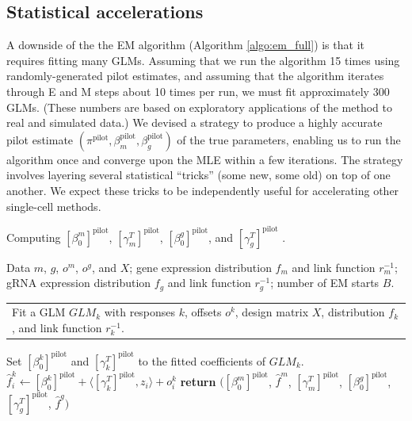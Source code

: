 \documentclass[11pt]{article}
\makeatletter
\newcommand{\multiline}[1]{%
	\begin{tabularx}{\dimexpr\linewidth-\ALG@thistlm}[t]{@{}X@{}}
		#1
	\end{tabularx}
}
\makeatother
\begin{document}
\subsection{Statistical accelerations}
A downside of the the EM algorithm (Algorithm \ref{algo:em_full}) is that it requires fitting many GLMs. Assuming that we run the algorithm 15 times using randomly-generated pilot estimates, and assuming that the algorithm iterates through E and M steps about 10 times per run, we must fit approximately 300 GLMs. (These numbers are based on exploratory applications of the method to real and simulated data.) We devised a strategy to produce a highly accurate pilot estimate $(\pi^\textrm{pilot}, \beta_m^\textrm{pilot}, \beta_g^\textrm{pilot})$ of the true parameters, enabling us to run the algorithm once and converge upon the MLE within a few iterations. The strategy involves layering several statistical ``tricks'' (some new, some old) on top of one another. We expect these tricks to be independently useful for accelerating other single-cell methods.

\begin{algorithm}
	\caption{Computing $[\beta_0^m]^\textrm{pilot}$, $[\gamma^T_m]^\textrm{pilot}$, $[\beta_0^g]^\textrm{pilot}$, and $[\gamma^T_g]^\textrm{pilot}$ .}\label{algo:pilot_estimates_1}
	\begin{algorithmic}[2]
		\Require Data $m$, $g$, $o^m$, $o^g$, and $X$; gene expression distribution $f_m$ and link function $r^{-1}_m$; gRNA expression distribution $f_g$ and link function $r^{-1}_g$; number of EM starts $B$.
		\State \multiline{Fit a GLM $GLM_k$ with responses $k$, offsets $o^k$, design matrix $X$, distribution $f_k$, and link function $r^{-1}_k$.}
		\State Set $[\beta_0^k]^\textrm{pilot}$ and $[\gamma_k^T]^\textrm{pilot}$ to the fitted coefficients of $GLM_k$.
		\State $\hat{f}^k_i \gets [\beta_0^k]^\textrm{pilot} + \langle [\gamma_k^T]^\textrm{pilot} , z_i \rangle + o_i^k$ 
		\EndFor
		\EndFor
		\State \textbf{return} $([\beta_0^m]^\textrm{pilot}$, $\hat{f}^m$, $[\gamma^T_m]^\textrm{pilot}$, $[\beta_0^g]^\textrm{pilot}$, $[\gamma^T_g]^\textrm{pilot}$, $\hat{f}^g)$
	\end{algorithmic}
\end{algorithm}
\end{document}
